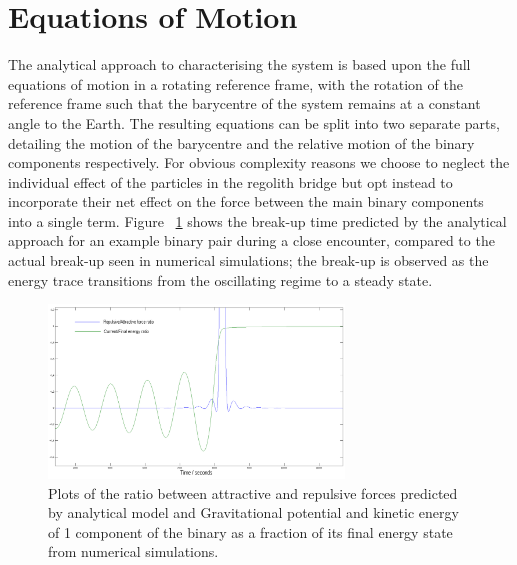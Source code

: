 \documentclass[letterpaper, preprint, paper,11pt]{AAS}	%
\begin{document}
\section{Equations of Motion}
The analytical approach to characterising the system is based upon the full equations of motion in a rotating reference frame, with the rotation of the reference frame such that the barycentre of the system remains at a constant angle to the Earth. The resulting equations can be split into two separate parts, detailing the motion of the barycentre and the relative motion of the binary components respectively. For obvious complexity reasons we choose to neglect the individual effect of the particles in the regolith bridge but opt instead to incorporate their net effect on the force between the main binary components into a single term. Figure ~\ref{fig:Analy} shows the break-up time predicted by the analytical approach for an example binary pair during a close encounter, compared to the actual break-up seen in numerical simulations; the break-up is observed as the energy trace transitions from the oscillating regime to a steady state.
\begin{figure}[H]
\centering
\includegraphics[width=0.7\textwidth]{binary_analy.png} 
\caption{Plots of the ratio between attractive and repulsive forces predicted by analytical model and Gravitational potential and kinetic energy of 1 component of the binary as a fraction of its final energy state from numerical simulations.} 
\label{fig:Analy}
\end{figure} 
\end{document}
